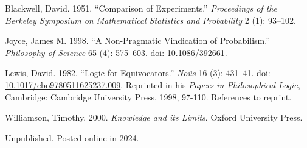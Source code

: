 \documentclass[
  11pt,
  letterpaper,
  DIV=11,
  numbers=noendperiod,
  twoside]{scrartcl}
\newlength{\cslhangindent}
\newenvironment{CSLReferences}[2] %
 {\begin{list}{}{%
  \setlength{\itemindent}{0pt}
  \setlength{\leftmargin}{0pt}
  \setlength{\parsep}{0pt}
  \ifodd #1
   \setlength{\leftmargin}{\cslhangindent}
   \setlength{\itemindent}{-1\cslhangindent}
  \fi
  \setlength{\itemsep}{#2\baselineskip}}}
 {\end{list}}
\begin{document}
\label{refs}
\begin{CSLReferences}{1}{0}
Blackwell, David. 1951. {``Comparison of Experiments.''}
\emph{Proceedings of the Berkeley Symposium on Mathematical Statistics
and Probability} 2 (1): 93--102.

Joyce, James M. 1998. {``A Non-Pragmatic Vindication of Probabilism.''}
\emph{Philosophy of Science} 65 (4): 575--603. doi:
\href{https://doi.org/10.1086/392661}{10.1086/392661}.

Lewis, David. 1982. {``Logic for Equivocators.''} \emph{No{û}s} 16 (3):
431--41. doi:
\href{https://doi.org/10.1017/cbo9780511625237.009}{10.1017/cbo9780511625237.009}.
Reprinted in his \emph{Papers in Philosophical Logic}, Cambridge:
Cambridge University Press, 1998, 97-110. References to reprint.

Williamson, Timothy. 2000. \emph{{Knowledge and its Limits}}. Oxford
University Press.

\end{CSLReferences}



\noindent Unpublished. Posted online in 2024.
\end{document}

